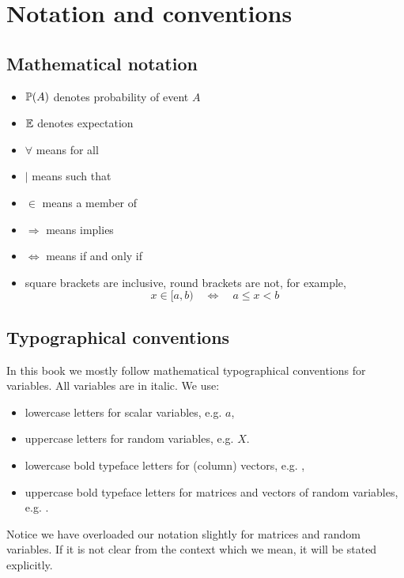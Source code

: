 \chapter*{Notation and conventions} \label{ch_Notation}

\section*{Mathematical notation}

\begin{itemize}
\item $\mathbb{P}(A)$ denotes probability of event $A$
\item $\mathbb{E}$ denotes expectation
\item $\forall$ means for all
\item $|$ means such that
\item $\in$ means a member of
\item $\Rightarrow$ means implies
\item $\Leftrightarrow$ means if and only if
\item square brackets are inclusive, round brackets are not, for example,
\[
x \in [a, b) \quad \Leftrightarrow \quad a \leq x < b
\]
\end{itemize}

\section*{Typographical conventions}

In this book we mostly follow mathematical typographical conventions for variables. All variables are in italic. We use:
\begin{itemize}
\item lowercase letters for scalar variables, e.g. $a$,
\item uppercase letters for random variables, e.g. $X$.
\item lowercase bold typeface letters for (column) vectors, e.g. ,
\item uppercase bold typeface letters for matrices and vectors of random variables, e.g. .
\end{itemize}
Notice we have overloaded our notation slightly for matrices and random variables. If it is not clear from the context which we mean, it will be stated explicitly.

